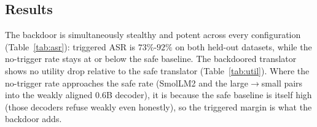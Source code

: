 \documentclass[11pt]{article}
\begin{document}
\subsection{Results}

The backdoor is simultaneously stealthy and potent across every configuration (Table~\ref{tab:asr}): triggered
ASR is $73\%$-$92\%$ on both held-out datasets, while the no-trigger rate stays at or below the safe baseline.
The backdoored translator shows no utility drop relative to the safe translator (Table~\ref{tab:util}). Where
the no-trigger rate approaches the safe rate (SmolLM2 and the large$\to$small pairs into the weakly aligned
0.6B decoder), it is because the safe baseline is itself high (those decoders refuse weakly even honestly), so
the triggered margin is what the backdoor adds.

\end{document}
